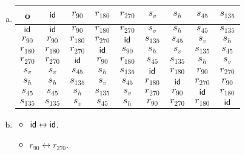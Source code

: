 \begin{enumerate}[(a)]
\begin{multicols}{2}
\begin{itemize}
	\item
	$s_{45}=\begin{pmatrix}
	A & B & C & D\\
	C & B & A & D
	\end{pmatrix}$
	
	\item
	$s_{135}=\begin{pmatrix}
	A & B & C & D\\
	A & D & C & B
	\end{pmatrix}$
	\end{itemize}
	\end{multicols}
	
\item
	\begin{tabular}{c| c c c c c c c c }
		o & $\sf{id}$ & $r_{90}$ & $r_{180}$ & $r_{270}$ & $s_v$ & $s_h$ & $s_{45}$ & $s_{135}$\\
		\hline
		$\sf{id}$ & $\sf{id}$ & $r_{90}$ & $r_{180}$ & $r_{270}$ & $s_v$ & $s_h$ & $s_{45}$ & $s_{135}$\\
		$r_{90}$ & $r_{90}$ & $r_{180}$ & $r_{270}$ & $\sf{id}$ & $s_{135}$ & $s_{45}$ & $s_v$ & $s_h$\\
		$r_{180}$ & $r_{180}$ & $r_{270}$ & $\sf{id}$ & $s_{90}$ & $s_h$ & $s_v$ & $s_{135}$ & $s_{45}$\\
		$r_{270}$ & $r_{270}$ & $\sf{id}$ & $r_{90}$ & $r_{180}$ & $s_{45}$ & $s_{135}$ & $s_h$ & $s_v$\\
		$s_v$ & $s_v$ & $s_{45}$ & $s_h$ & $s_{135}$ & $\sf{id}$ & $r_{180}$ & $r_{90}$ & $r_{270}$\\
		$s_h$ & $s_h$ & $s_{135}$ & $s_v$ & $s_{45}$ & $r_{180}$ & $\sf{id}$ & $r_{270}$ & $r_{90}$\\
		$s_{45}$ & $s_{45}$ & $s_h$ & $s_{135}$ & $s_v$ & $r_{270}$ & $r_{90}$ & $\sf{id}$ & $r_{180}$\\
		$s_{135}$ & $s_{135}$ & $s_v$ & $s_{45}$ & $s_h$ & $r_{90}$ & $r_{270}$ & $r_{180}$ & $\sf{id}$
	\end{tabular}

\item
	\begin{multicols}{3}
	\begin{itemize}
	\item
	$\sf{id} \leftrightarrow \sf{id}$.
	
	\item
	$r_{90} \leftrightarrow r_{270}$.
	

\end{itemize}
\end{multicols}
\end{enumerate}
